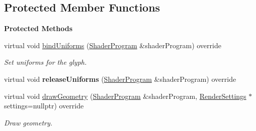 \subsection*{Protected Member Functions}
\begin{Indent}\textbf{ Protected Methods}\par
\begin{DoxyCompactItemize}
\item 
\mbox{\label{classrev_1_1_debug_coordinate_axes_a7b25b858e11f69e3177151d7aa7f0872}} 
virtual void \mbox{\hyperlink{classrev_1_1_debug_coordinate_axes_a7b25b858e11f69e3177151d7aa7f0872}{bind\+Uniforms}} (\mbox{\hyperlink{classrev_1_1_shader_program}{Shader\+Program}} \&shader\+Program) override
\begin{DoxyCompactList}\small\item\em Set uniforms for the glyph. \end{DoxyCompactList}\item 
\mbox{\label{classrev_1_1_debug_coordinate_axes_a814682421af5199f9cadd61dbe523d88}} 
virtual void {\bfseries release\+Uniforms} (\mbox{\hyperlink{classrev_1_1_shader_program}{Shader\+Program}} \&shader\+Program) override
\item 
\mbox{\label{classrev_1_1_debug_coordinate_axes_aff53133ea6bb7a313fc74e88c04b21bc}} 
virtual void \mbox{\hyperlink{classrev_1_1_debug_coordinate_axes_aff53133ea6bb7a313fc74e88c04b21bc}{draw\+Geometry}} (\mbox{\hyperlink{classrev_1_1_shader_program}{Shader\+Program}} \&shader\+Program, \mbox{\hyperlink{classrev_1_1_render_settings}{Render\+Settings}} $\ast$settings=nullptr) override
\begin{DoxyCompactList}\small\item\em Draw geometry. \end{DoxyCompactList}\end{DoxyCompactItemize}
\end{Indent}
